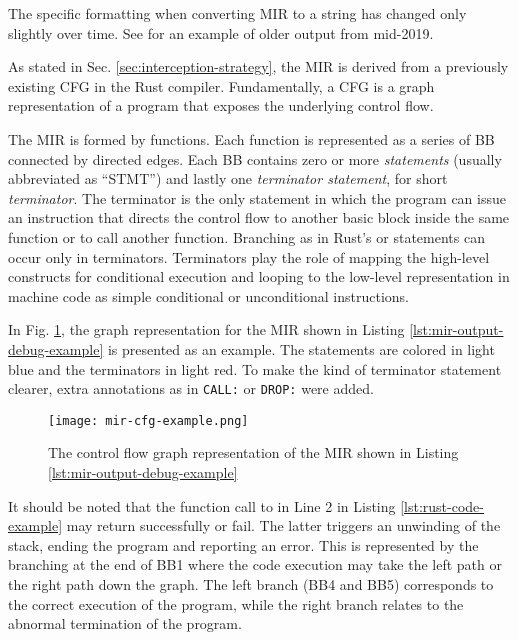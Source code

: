 \documentclass[../Thesis.tex]{subfiles}
\begin{document}
The specific formatting when converting \acrshort{MIR} to a string has changed only slightly over time.
See \cite[Section 3.3]{meyer2020} for an example of older output from mid-2019.

As stated in Sec. \ref{sec:interception-strategy}, the \acrshort{MIR} is derived
from a previously existing \acrfull{CFG} in the Rust compiler.
Fundamentally, a \acrshort{CFG} is a graph representation of a program
that exposes the underlying control flow.

The MIR is formed by functions.
Each function is represented as a series of \acrfull{BB} connected by directed edges.
Each \acrshort{BB} contains zero or more \emph{statements} (usually abbreviated as ``STMT'')
and lastly one \emph{terminator statement}, for short \emph{terminator}.
The terminator is the only statement in which the program can issue an instruction
that directs the control flow to another basic block inside the same function
or to call another function.
Branching as in Rust's  or  statements can occur only in terminators.
Terminators play the role of mapping the high-level constructs
for conditional execution and looping to the low-level representation in machine code
as simple conditional or unconditional  instructions.

In Fig. \ref{fig:mir-cfg-example}, the graph representation
for the MIR shown in Listing \ref{lst:mir-output-debug-example} is presented as an example.
The statements are colored in light blue and the terminators in light red.
To make the kind of terminator statement clearer,
extra annotations as in \texttt{CALL:} or \texttt{DROP:} were added.

\begin{figure}[!htb]
    \centering
    \texttt{[image: mir-cfg-example.png]}
    \caption{The control flow graph representation of the MIR shown in Listing \ref{lst:mir-output-debug-example}}
    \label{fig:mir-cfg-example}
\end{figure}

It should be noted that the function call to 
in Line 2 in Listing \ref{lst:rust-code-example} may return successfully or fail.
The latter triggers an unwinding of the stack, ending the program and reporting an error.
This is represented by the branching at the end of BB1 where the code execution
may take the left path or the right path down the graph.
The left branch (BB4 and BB5) corresponds to the correct execution of the program,
while the right branch relates to the abnormal termination of the program.
\end{document}
